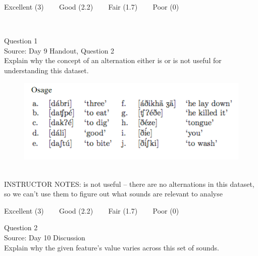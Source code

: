 \documentclass[12pt]{article}
\begin{document}
\vfill
Excellent (3) ~~~ Good (2.2) ~~~ Fair (1.7) ~~~ Poor (0)
\newpage

\begin{center}
\textbf{{\color{red}{\HUGE END OF EXAM}}}\\

\end{center}
\newpage

\begin{center}
\textbf{{\color{blue}{\HUGE START OF EXAM\\}}}

\textbf{{\color{blue}{\HUGE Student ID: 3288\\}}}

\textbf{{\color{blue}{\HUGE 10:50 - 11:10 AM\\}}}

\end{center}
\newpage

{\large Question 1}\\

Source: Day 9 Handout, Question 2\\

Explain why the concept of an alternation either is or is not useful for understanding this dataset.\\

\begin{figure}[H]
\includegraphics{../images/osage.png}
\end{figure}

~\\
INSTRUCTOR NOTES: is not useful -- there are no alternations in this dataset, so we can't use them to figure out what sounds are relevant to analyse


\vfill
Excellent (3) ~~~ Good (2.2) ~~~ Fair (1.7) ~~~ Poor (0)
\newpage

{\large Question 2}\\

Source: Day 10 Discussion\\

Explain why the given feature's value varies across this set of sounds.\\
\end{document}
